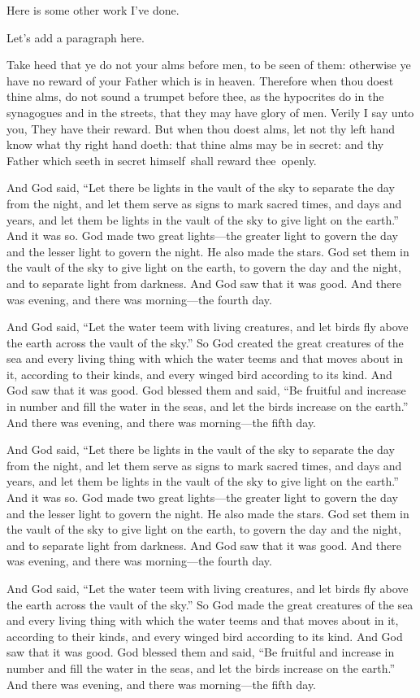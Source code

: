\documentclass{grattanAlpha}
\begin{document}
Here is some other work I've done.

Let's add a paragraph here. 

Take heed that ye do not your alms before men, to be seen of them: otherwise ye have no reward of your Father which is in heaven.
Therefore when thou doest thine alms, do not sound a trumpet before thee, as the hypocrites do in the synagogues and in the streets, that they may have glory of men.
Verily I say unto you, They have their reward.  
But when thou doest alms, let not thy left hand know what thy right hand doeth: that thine alms may be in secret: and thy Father which seeth in secret himself~shall reward thee~openly.

And God said, “Let there be lights in the vault of the sky to separate the day from the night, and let them serve as signs to mark sacred times, and days and years, and let them be lights in the vault of the sky to give light on the earth.”
And it was so.
God made two great lights—the greater light to govern the day and the lesser light to govern the night.
He also made the stars.
God set them in the vault of the sky to give light on the earth, to govern the day and the night, and to separate light from darkness.
And God saw that it was good.
And there was evening, and there was morning—the fourth day.

And God said, “Let the water teem with living creatures, and let birds fly above the earth across the vault of the sky.”
So God created the great creatures of the sea and every living thing with which the water teems and that moves about in it, according to their kinds, and every winged bird according to its kind.
And God saw that it was good.
God blessed them and said, “Be fruitful and increase in number and fill the water in the seas, and let the birds increase on the earth.”
And there was evening, and there was morning—the fifth day.

And God said, “Let there be lights in the vault of the sky to separate the day from the night, and let them serve as signs to mark sacred times, and days and years, and let them be lights in the vault of the sky to give light on the earth.”
And it was so.
God made two great lights—the greater light to govern the day and the lesser light to govern the night.
He also made the stars.
God set them in the vault of the sky to give light on the earth, to govern the day and the night, and to separate light from darkness.
And God saw that it was good.
And there was evening, and there was morning—the fourth day.

And God said, “Let the water teem with living creatures, and let birds fly above the earth across the vault of the sky.”
So God made the great creatures of the sea and every living thing with which the water teems and that moves about in it, according to their kinds, and every winged bird according to its kind.
And God saw that it was good.
God blessed them and said, “Be fruitful and increase in number and fill the water in the seas, and let the birds increase on the earth.”
And there was evening, and there was morning—the fifth day.
\end{document}
